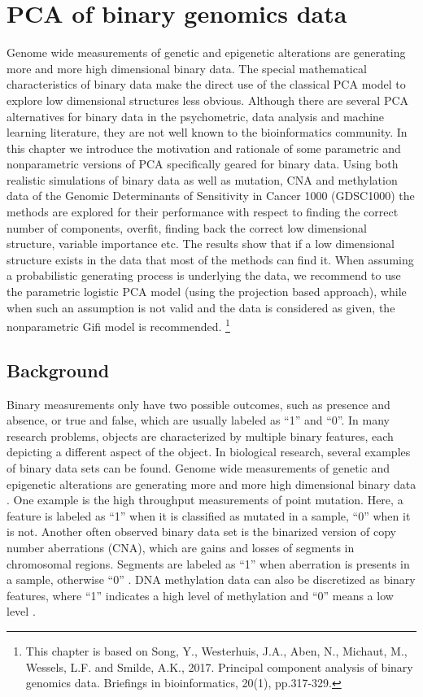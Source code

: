 \chapter{PCA of binary genomics data} \label{chapter:2}
Genome wide measurements of genetic and epigenetic alterations are generating more and more high dimensional binary data. The special mathematical characteristics of binary data make the direct use of the classical PCA model to explore low dimensional structures less obvious. Although there are several PCA alternatives for binary data in the psychometric, data analysis and machine learning literature, they are not well known to the bioinformatics community. In this chapter we introduce the motivation and rationale of some parametric and nonparametric versions of PCA specifically geared for binary data. Using both realistic simulations of binary data as well as mutation, CNA and methylation data of the Genomic Determinants of Sensitivity in Cancer 1000 (GDSC1000) the methods are explored for their performance with respect to finding the correct number of components, overfit, finding back the correct low dimensional structure, variable importance etc. The results show that if a low dimensional structure exists in the data that most of the methods can find it. When assuming a probabilistic generating process is underlying the data, we recommend to use the parametric logistic PCA model (using the projection based approach), while when such an assumption is not valid and the data is considered as given, the nonparametric Gifi model is recommended.
\footnote{This chapter is based on Song, Y., Westerhuis, J.A., Aben, N., Michaut, M., Wessels, L.F. and Smilde, A.K., 2017. Principal component analysis of binary genomics data. Briefings in bioinformatics, 20(1), pp.317-329.}

\section{Background}
Binary measurements only have two possible outcomes, such as presence and absence, or true and false, which are usually labeled as ``1'' and ``0''. In many research problems, objects are characterized by multiple binary features, each depicting a different aspect of the object. In biological research, several examples of binary data sets can be found. Genome wide measurements of genetic and epigenetic alterations are generating more and more high dimensional binary data \cite{mclendon2008comprehensive, iorio2016landscape}. One example is the high throughput measurements of point mutation. Here, a feature is labeled as ``1'' when it is classified as mutated in a sample, ``0'' when it is not. Another often observed binary data set is the binarized version of copy number aberrations (CNA), which are gains and losses of segments in chromosomal regions. Segments are labeled as ``1'' when aberration is presents in a sample, otherwise ``0'' \cite{wu2014detecting}. DNA methylation data can also be discretized as binary features, where ``1'' indicates a high level of methylation and ``0'' means a low level \cite{iorio2016landscape}.

